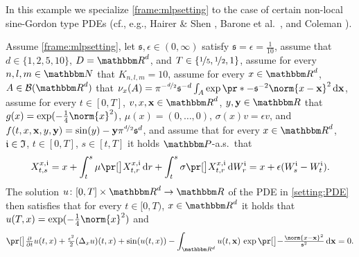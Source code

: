 \begin{example}

	\label{exampleMLP:sinegordon_nonlocal}
	In this example we specialize \cref{frame:mlpsetting} to the case of certain non-local sine-Gordon type PDEs (cf., e.g., Hairer \& Shen \citep{Hairer2016}, Barone et al.~\citep{Barone1971}, and Coleman \citep{Coleman1994}).

	Assume 
		\cref{frame:mlpsetting},
	let
		$\mathfrak s,\epsilon\in(0,\infty)$
	satisfy 
		$\mathfrak{s} = \epsilon = \tfrac{1}{10}$,
	assume that
		$d\in\{1,2,5,10\}$,
		$D = \R^d$, 
		and	$T\in\{\nicefrac{1}{5},\nicefrac{1}{2},1\}$,
	assume for every 
		$n,l,m\in \N$ 
	that
		$K_{n,l,m} = 10$,
	assume for every
		$x \in \R^d$,
		$A \in \mathcal{B}(\R^d)$
	that
		$\nu_x(A) = \pi^{-\nicefrac{d}{2}}\mathfrak{s}^{-d}\int_A \exp\pr*{-\mathfrak{s}^{-2}\norm{x - \mathbf{x}}^2}\,\diff\mathbf{x}$,
	assume for every 
		$t \in [0,T]$,
		$v,x,\mathbf{x} \in \R^d$,
		$y,\mathbf{y} \in \R$
	that
		$g(x)= \exp (- \tfrac{1}{4}\norm{x}^2)$,
		$\mu(x)=(0,\dots,0)$,
		$\sigma(x) v = \epsilon v$, and
		$f(t,x,\mathbf{x},y,\mathbf{y})= \sin(y) -\mathbf{y}\pi^{\nicefrac{d}{2}}\mathfrak{s}^d$,
	and	assume that for every 
		$x\in \R^{d}$, 
		$\mathfrak{i} \in \mathfrak{I}$, 
		$t\in [0,T]$, 
		$s\in [t,T]$ 
	it holds $\P$-a.s.\ that
	\begin{equation}
		X^{x,\dindex}_{t,s} 
		= 
		x + \int_{t}^{s} \mu\bpr{X^{x,\dindex}_{t,r}} \, \diff r + \int^{s}_{t} \sigma \bpr{X^{x,\dindex}_{t,r}} \, \diff W^{\dindex}_{r}
		=
		x+\epsilon(W^\dindex_s-W^\dindex_t)
		.
	\end{equation}
	The solution 
		$u\colon[0,T]\times \R^d \to \R$ 
		of the PDE in \eqref{setting:PDE} then satisfies that for every
			$t\in [0,T)$, 
			$x\in\R^d$
		it holds that
			$u(T,x) = \exp (-\tfrac{1}{4}\norm{x}^2)$ and
		\begin{equation}
			\label{eqMLP:sinegordon_nonlocal}
			\bpr{\tfrac{\partial}{\partial t}u}(t,x)
			+
			\tfrac{\epsilon^2}{2}(\Delta_x u)(t,x) 
			+ 
			\sin ( u(t,x) ) 
			- 
			\int_{\R^d} u(t,\mathbf{x})\, \exp\bpr{-\tfrac{\norm{x-\mathbf{x}}^2}{\mathfrak{s}^2}}\,\diff \mathbf{x} 
			=
			0
			.
		\end{equation}
\end{example}

